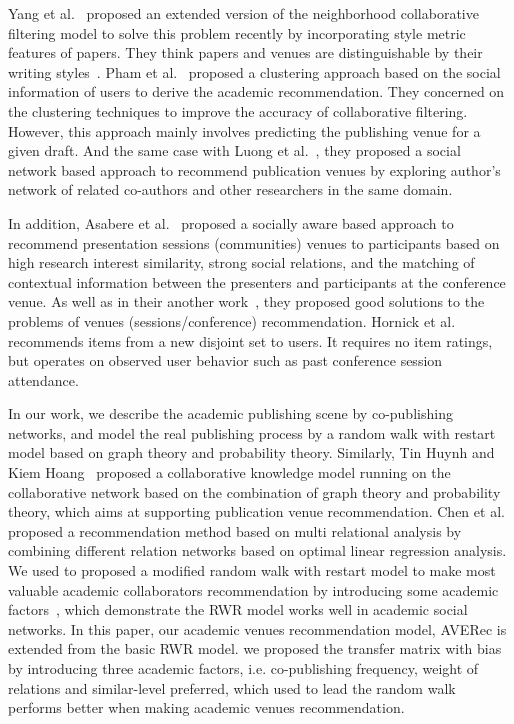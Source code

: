 \documentclass[9pt]{acm_proc_article-sp}
\begin{document}
Yang et al.~\cite{yang2012venue} proposed an extended version of the neighborhood collaborative filtering model to solve this problem recently by incorporating style metric features of papers. They think papers and venues are distinguishable by their writing styles~\cite{yang2012distinguishing}. Pham et al.~\cite{pham2011clustering} proposed a clustering approach based on the social information of users to derive the academic recommendation. They concerned on the clustering techniques to improve the accuracy of collaborative filtering. However, this approach mainly involves predicting the publishing venue for a given draft. And the same case with Luong et al.~\cite{luong2012publication}, they proposed a social network based approach to recommend publication venues by exploring author's network of related co-authors and other researchers in the same domain.

In addition, Asabere et al.~\cite{asabere2014improving} proposed a socially aware based approach to recommend presentation sessions (communities) venues to participants based on high research interest similarity, strong social relations, and the matching of contextual information between the presenters and participants at the conference venue. As well as in their another work~\cite{xia2013socially}, they proposed good solutions to the problems of venues (sessions/conference) recommendation. Hornick et al.~\cite{hornick2012extending} recommends items from a new disjoint set to users. It requires no item ratings, but operates on observed user behavior such as past conference session attendance.

In our work, we describe the academic publishing scene by co-publishing networks, and model the real publishing process by a random walk with restart model based on graph theory and probability theory. Similarly, Tin Huynh and Kiem Hoang~\cite{huynh2012modeling} proposed a collaborative knowledge model running on the collaborative network based on the combination of graph theory and probability theory, which aims at supporting publication venue recommendation. Chen et al.~\cite{chen2012social} proposed a recommendation method based on multi relational analysis by combining different relation networks based on optimal linear regression analysis. We used to proposed a modified random walk with restart model to make most valuable academic collaborators recommendation by introducing some academic factors~\cite{xia2014mvcwalker,li2014acrec}, which demonstrate the RWR model works well in academic social networks. In this paper, our academic venues recommendation model, AVERec is extended from the basic RWR model. we proposed the transfer matrix with bias by introducing three academic factors, i.e. co-publishing frequency, weight of relations and similar-level preferred, which used to lead the random walk performs better when making academic venues recommendation.
\end{document}
